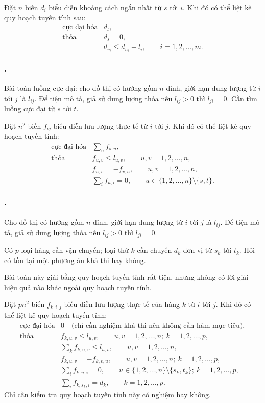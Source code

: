 \documentclass[11pt]{article}
\begin{document}
Đặt \(n\) biến \(d_i\) biểu diễn khoảng cách ngắn nhất từ \(s\) tới \(i\).
Khi đó có thể liệt kê quy hoạch tuyến tính sau:
\[
\begin{array}{ll}
\text{cực đại hóa} & d_t,\\
\text{thỏa} & d_s=0,\\
& d_{v_i}\le d_{u_i}+l_i,\qquad i=1,2,\ldots,m.
\end{array}
\]

\paragraph{.}
Bài toán luồng cực đại: cho đồ thị có hướng gồm \(n\) đỉnh, giới hạn dung
lượng từ \(i\) tới \(j\) là \(l_{ij}\). Để tiện mô tả, giả sử dung lượng thỏa
nếu \(l_{ij}>0\) thì \(l_{ji}=0\). Cần tìm luồng cực đại từ \(s\) tới \(t\).

Đặt \(n^2\) biến \(f_{ij}\) biểu diễn lưu lượng thực tế từ \(i\) tới \(j\).
Khi đó có thể liệt kê quy hoạch tuyến tính:
\[
\begin{array}{ll}
\text{cực đại hóa} & \displaystyle \sum_u f_{s,u},\\[0.4em]
\text{thỏa} & f_{u,v}\le l_{u,v},\qquad u,v=1,2,\ldots,n,\\
& f_{u,v}=-f_{v,u},\qquad u,v=1,2,\ldots,n,\\
& \displaystyle \sum_i f_{u,i}=0,\qquad
  u\in\{1,2,\ldots,n\}\setminus\{s,t\}.
\end{array}
\]

\paragraph{.}
Cho đồ thị có hướng gồm \(n\) đỉnh, giới hạn dung lượng từ \(i\) tới \(j\) là
\(l_{ij}\). Để tiện mô tả, giả sử dung lượng thỏa nếu \(l_{ij}>0\) thì
\(l_{ji}=0\).

Có \(p\) loại hàng cần vận chuyển; loại thứ \(k\) cần chuyển \(d_k\) đơn vị từ
\(s_k\) tới \(t_k\). Hỏi có tồn tại một phương án khả thi hay không.

Bài toán này giải bằng quy hoạch tuyến tính rất tiện, nhưng không có lời giải
hiệu quả nào khác ngoài quy hoạch tuyến tính.

Đặt \(pn^2\) biến \(f_{k,i,j}\) biểu diễn lưu lượng thực tế của hàng \(k\) từ
\(i\) tới \(j\). Khi đó có thể liệt kê quy hoạch tuyến tính:
\[
\begin{array}{ll}
\text{cực đại hóa} & 0\quad\text{(chỉ cần nghiệm khả thi nên không cần hàm mục tiêu)},\\[0.4em]
\text{thỏa} & f_{k,u,v}\le l_{u,v},
  \qquad u,v=1,2,\ldots,n;\ k=1,2,\ldots,p,\\
& \displaystyle \sum_k f_{k,u,v}\le l_{u,v},
  \qquad u,v=1,2,\ldots,n,\\
& f_{k,u,v}=-f_{k,v,u},
  \qquad u,v=1,2,\ldots,n;\ k=1,2,\ldots,p,\\
& \displaystyle \sum_i f_{k,u,i}=0,\qquad
  u\in\{1,2,\ldots,n\}\setminus\{s_k,t_k\};\ k=1,2,\ldots,p,\\
& \displaystyle \sum_i f_{k,s_k,i}=d_k,\qquad k=1,2,\ldots,p.
\end{array}
\]
Chỉ cần kiểm tra quy hoạch tuyến tính này có nghiệm hay không.
\end{document}
